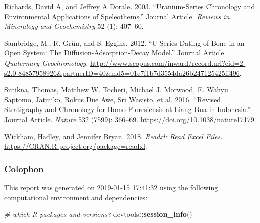 \documentclass[]{elsarticle} %
\newenvironment{Shaded}{\begin{snugshade}}{\end{snugshade}}
\newcommand{\CommentTok}[1]{\textcolor[rgb]{0.56,0.35,0.01}{\textit{#1}}}
\newcommand{\KeywordTok}[1]{\textcolor[rgb]{0.13,0.29,0.53}{\textbf{#1}}}
\newcommand{\NormalTok}[1]{#1}
\newcommand{\OperatorTok}[1]{\textcolor[rgb]{0.81,0.36,0.00}{\textbf{#1}}}
\begin{document}
\leavevmode\hypertarget{ref-RN4494}{}%
Richards, David A, and Jeffrey A Dorale. 2003. ``Uranium-Series Chronology and Environmental Applications of Speleothems.'' Journal Article. \emph{Reviews in Mineralogy and Geochemistry} 52 (1): 407--60.

\leavevmode\hypertarget{ref-Sambridge2012}{}%
Sambridge, M., R. Grün, and S. Eggins. 2012. ``U-Series Dating of Bone in an Open System: The Diffusion-Adsorption-Decay Model.'' Journal Article. \emph{Quaternary Geochronology}. \url{http://www.scopus.com/inward/record.url?eid=2-s2.0-84857958926\&partnerID=40\&md5=01e7f1b7d3554da26b247125425ff496}.

\leavevmode\hypertarget{ref-Sutikna2016}{}%
Sutikna, Thomas, Matthew W. Tocheri, Michael J. Morwood, E. Wahyu Saptomo, Jatmiko, Rokus Due Awe, Sri Wasisto, et al. 2016. ``Revised Stratigraphy and Chronology for Homo Floresiensis at Liang Bua in Indonesia.'' Journal Article. \emph{Nature} 532 (7599): 366--69. \url{https://doi.org/10.1038/nature17179}.

\leavevmode\hypertarget{ref-Wickham_readxl}{}%
Wickham, Hadley, and Jennifer Bryan. 2018. \emph{Readxl: Read Excel Files}. \url{https://CRAN.R-project.org/package=readxl}.

\newpage

\hypertarget{colophon}{%
\subsubsection{Colophon}\label{colophon}}

This report was generated on 2019-01-15 17:41:32 using the following computational environment and dependencies:

\begin{Shaded}
\begin{Highlighting}[]
\CommentTok{# which R packages and versions?}
\NormalTok{devtools}\OperatorTok{::}\KeywordTok{session_info}\NormalTok{()}
\end{Highlighting}
\end{Shaded}
\end{document}
